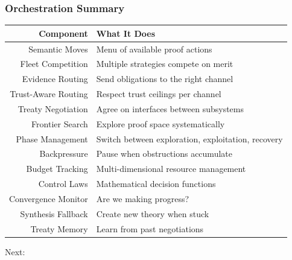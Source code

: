 \begin{frame}
\frametitle{Orchestration Summary}
\begin{center}
\small
\begin{tabular}{@{} r l @{}}
  \toprule
  \textbf{Component} & \textbf{What It Does} \\
  \midrule
  Semantic Moves    & Menu of available proof actions \\
  Fleet Competition & Multiple strategies compete on merit \\
  Evidence Routing  & Send obligations to the right channel \\
  Trust-Aware Routing & Respect trust ceilings per channel \\
  Treaty Negotiation & Agree on interfaces between subsystems \\
  Frontier Search   & Explore proof space systematically \\
  Phase Management  & Switch between exploration, exploitation, recovery \\
  Backpressure      & Pause when obstructions accumulate \\
  Budget Tracking   & Multi-dimensional resource management \\
  Control Laws      & Mathematical decision functions \\
  Convergence Monitor & Are we making progress? \\
  Synthesis Fallback & Create new theory when stuck \\
  Treaty Memory     & Learn from past negotiations \\
  \bottomrule
\end{tabular}
\end{center}
\vfill
\begin{center}
\large Next: 
\end{center}
\end{frame}
